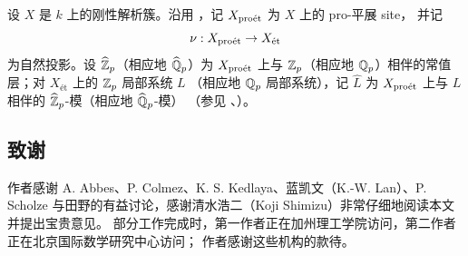设 $X$ 是 $k$ 上的刚性解析簇。沿用 \cite{Sch2}，记 $X_{\text{pro\'et}}$ 为 $X$ 上的 pro-平展 site，
并记
\[
  \nu:X_{\text{pro\'et}}\to X_{\text{\'et}}
\]
为自然投影。设 $\widehat{\mathbb{Z}}_p$（相应地 $\widehat{\mathbb{Q}}_p$）为 $X_{\text{pro\'et}}$ 上与
$\mathbb{Z}_p$（相应地 $\mathbb{Q}_p$）相伴的常值层；对 $X_{\text{\'et}}$ 上的 $\mathbb{Z}_p$ 局部系统 $L$
（相应地 $\mathbb{Q}_p$ 局部系统），记 $\widehat L$ 为 $X_{\text{pro\'et}}$ 上与 $L$ 相伴的
$\widehat{\mathbb{Z}}_p$-模（相应地 $\widehat{\mathbb{Q}}_p$-模）
（参见 \cite[§8.2]{Sch2}、\cite[§9.1]{KL1}）。

\subsection*{致谢}

作者感谢 A. Abbes、P. Colmez、K. S. Kedlaya、蓝凯文（K.-W. Lan）、P. Scholze
与田野的有益讨论，感谢清水浩二（Koji Shimizu）非常仔细地阅读本文并提出宝贵意见。
部分工作完成时，第一作者正在加州理工学院访问，第二作者正在北京国际数学研究中心访问；
作者感谢这些机构的款待。
